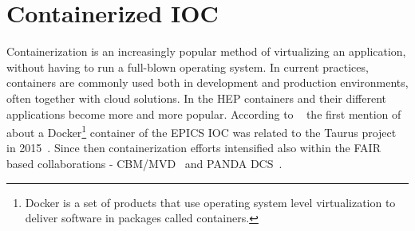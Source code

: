 \section{Containerized IOC}
\label{containerizer_ioc}
Containerization is an increasingly popular method of virtualizing an application, without having to run a full-blown operating system. In current practices, containers are commonly used both in development and production environments, often together with cloud solutions. In the \gls{HEP} containers and their different applications become more and more popular. According to ~\cite{Klaus2021} the first mention of about a Docker\footnote{Docker is a set of products that use operating system level virtualization to deliver software in packages called containers.} container of the \gls{EPICS} \gls{IOC} was related to the Taurus project in 2015~\cite{taurus}. Since then containerization efforts intensified also within the \gls{FAIR} based collaborations - \gls{CBM}/\gls{MVD}~\cite{Klaus2021} and PANDA DCS~\cite{PANDA_1}.

